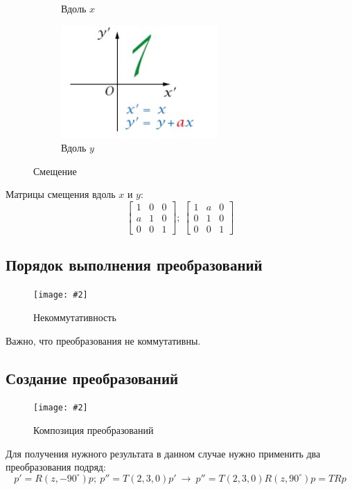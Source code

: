 \documentclass[a4paper, 14pt]{extarticle}
\newcommand{\screenshot}[3]{
	\begin{figure}[h]
		\centering
		\texttt{[image: \#2]}
		\caption{#3}
	\end{figure}
}
\begin{document}
\begin{figure}[h]
\begin{subfigure}[b]{0.3\textwidth}
		\caption{Вдоль $x$}
	\end{subfigure}
	\begin{subfigure}[b]{0.3\textwidth}
		\centering
		\includegraphics[width=\textwidth]{l3/S016.jpg}
		\caption{Вдоль $y$}
	\end{subfigure}
	\caption{Смещение}
\end{figure}
Матрицы смещения вдоль $x$ и $y$:
$$
\begin{bmatrix}
	1 & 0 & 0 \\
	a & 1 & 0 \\
	0 & 0 & 1
\end{bmatrix}; \ 
\begin{bmatrix}
	1 & a & 0 \\
	0 & 1 & 0 \\
	0 & 0 & 1
\end{bmatrix}
$$

\subsection{Порядок выполнения преобразований}
\screenshot{width=12cm}{l3/S017.jpg}{Некоммутативность}
Важно, что преобразования не коммутативны. 

\subsection{Создание преобразований}
\screenshot{width=12cm}{l3/S018.jpg}{Композиция преобразований}
Для получения нужного результата в данном случае нужно применить два преобразования подряд:
$$
p'=R(z,-90^\circ)p; \ p''=T(2,3,0)p' \ \rightarrow \ p''=T(2,3,0)R(z,90^\circ)p = TRp
$$
\end{document}
